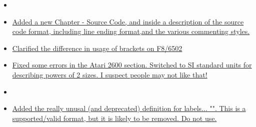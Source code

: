\begin{itemize}
\item[]
\item \hyperref[changelog:20200908source]{Added a new Chapter - Source Code, and inside a description of the source code format, including line ending format,and  the various commenting styles.}
\item \hyperref[changelog:20200908brackets]{Clarified the difference in usage of brackets on F8/6502}
\item \hyperref[changelog:20200908atari]{Fixed some errors in the Atari 2600 section. Switched to SI standard units for describing powers of 2 sizes. I suspect people may not like that!}

\item[]
\item \hyperref[changelog:20200907deprecated]{Added the really unusal (and deprecated) definition for labels... "". This is a supported/valid format, but it is likely to be removed. Do not use.}


\end{itemize}
